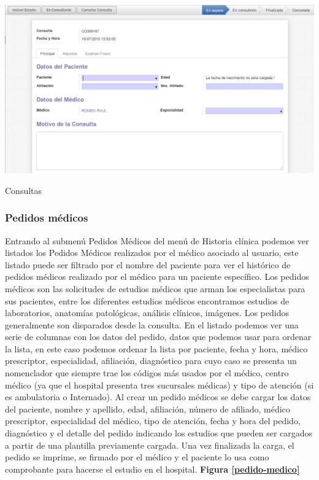 \begin{correccionFigure}[h]
      \centering
      \includegraphics[width=.8\textwidth]{img/tp1/HE/ConsultaDia}
      \caption{Consultas}
      \label{consulta-dia}
\end{correccionFigure}

{\correccionTexto
\subsubsection{Pedidos médicos}
Entrando al submenú Pedidos Médicos del menú de Historia clínica podemos ver listados los Pedidos Médicos realizados por el médico asociado al usuario, este listado puede ser filtrado por el nombre del paciente para ver el histórico de pedidos médicos realizado por el médico para un paciente específico. Los pedidos médicos son las solicitudes de estudios médicos que arman los especialistas para sus pacientes, entre los diferentes estudios médicos encontramos estudios de laboratorios, anatomías patológicas, análisis clínicos, imágenes. Los pedidos generalmente son disparados desde la consulta. En el listado podemos ver una serie de columnas con los datos del pedido, datos que podemos usar para ordenar la lista, en este caso podemos ordenar la lista por paciente, fecha y hora, médico prescriptor, especialidad, afiliación, diagnóstico para cuyo caso se presenta un nomenclador que siempre trae los códigos más usados por el médico, centro médico (ya que el hospital presenta tres sucursales médicas) y tipo de atención (si es ambulatoria o Internado). Al crear un pedido médicos se debe cargar los datos del paciente, nombre y apellido, edad, afiliación, número de afiliado, médico prescriptor, especialidad del médico, tipo de atención, fecha y hora del pedido, diagnóstico y el detalle del pedido indicando los estudios que pueden ser cargados a partir de una plantilla previamente cargada. Una vez finalizada la carga, el pedido se imprime, se firmado por el médico y el paciente lo usa como comprobante para hacerse el estudio en el hospital. \textbf{Figura \ref{pedido-medico}}}

